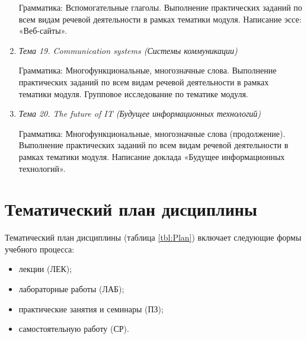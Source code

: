 \begin{enumerate}
Грамматика: Вспомогательные глаголы. Выполнение практических заданий по всем видам речевой деятельности в рамках тематики модуля. Написание эссе: «Веб-сайты».
\item \textit{Тема 19. Communication systems (Системы коммуникации)}\par
Грамматика: Многофункциональные, многозначные слова. Выполнение практических заданий по всем видам речевой деятельности в рамках тематики модуля. Групповое исследование по тематике модуля.
\item \textit{Тема 20. The future of IT (Будущее информационных технологий)}\par
Грамматика: Многофункциональные, многозначные слова (продолжение). Выполнение практических заданий по всем видам речевой деятельности в рамках тематики модуля. Написание доклада «Будущее информационных технологий».
\end{enumerate}

\section{Тематический план дисциплины}
Тематический план дисциплины (таблица \ref{tbl:Plan}) включает следующие формы учебного процесса:
\begin{itemize}
\item лекции (ЛЕК); 
\item лабораторные работы (ЛАБ); 
\item практические занятия и семинары (ПЗ); 
\item самостоятельную работу (СР).
\end{itemize}


